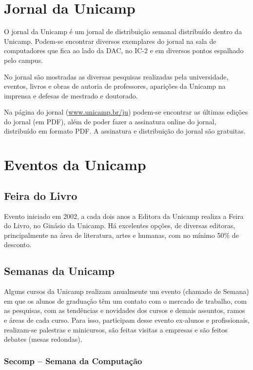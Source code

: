 
\section{Jornal da Unicamp}

O jornal da Unicamp é um jornal de distribuição semanal distribuído dentro da
Unicamp. Podem-se encontrar diversos exemplares do jornal na sala de computadores
que fica ao lado da DAC, no IC-2 e em diversos pontos espalhado pelo campus.

No jornal são mostradas as diversas pesquisas realizadas pela universidade,
eventos, livros e obras de autoria de professores, aparições da Unicamp na
imprensa e defesas de mestrado e doutorado.

Na página do jornal (\url{www.unicamp.br/ju}) podem-se encontrar as
últimas edições do jornal (em PDF), além de poder fazer a assinatura online do
jornal, distribuído em formato PDF. A assinatura e distribuição do jornal são
gratuitas.

\section{Eventos da Unicamp}
\subsection{Feira do Livro}

Evento iniciado em 2002, a cada dois anos a Editora da Unicamp realiza a Feira
do Livro, no Ginásio da Unicamp. Há excelentes opções, de diversas editoras,
principalmente na área de literatura, artes e humanas, com no mínimo 50\% de
desconto.

\subsection{Semanas da Unicamp}

Alguns cursos da Unicamp realizam anualmente um evento (chamado de Semana) em
que os alunos de graduação têm um contato com o mercado de trabalho, com as
pesquisas, com as tendências e novidades dos cursos e demais assuntos, ramos
e áreas de cada curso. Para isso, participam desse evento ex-alunos
e profissionais, realizam-se palestras e minicursos, são feitas visitas
a empresas e são feitos debates (mesas redondas).

\subsubsection{Secomp -- Semana da Computação}

